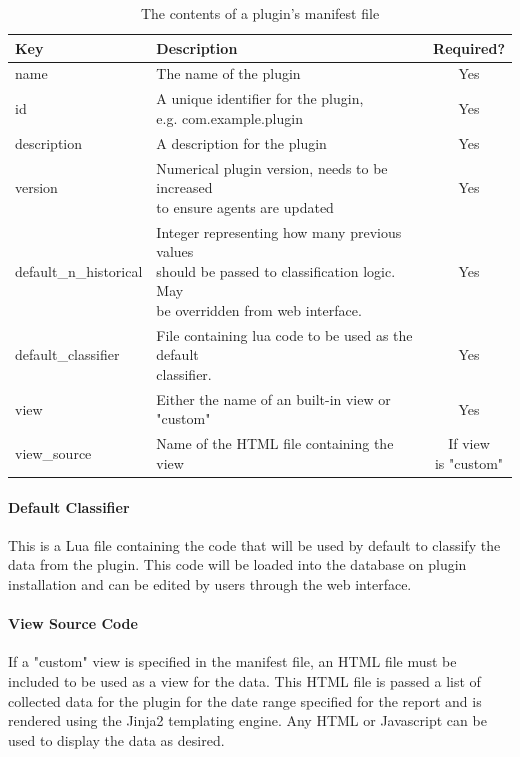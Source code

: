 \documentclass[bsc,logo,twoside,singlespacing,notimes]{infthesis}
\begin{document}
\begin{table}[H]
	\centering
	\caption{The contents of a plugin's manifest file}
	\label{table-manifest-contents}
    \begin{tabular}{|l|l|c|}
    \hline
    \textbf{Key} & \textbf{Description} & \textbf{Required?} \\ \hline \hline
    name
    	& The name of the plugin
    	& Yes \\ \hline
    id
    	& \shortstack[l]{A unique identifier for the plugin,\\
    		e.g. com.example.plugin}
    	& Yes \\ \hline
    description
    	& A description for the plugin
    	& Yes \\ \hline
    version
    	& \shortstack[l]{Numerical plugin version, needs to be increased\\to ensure
    		agents are updated}
    	& Yes \\ \hline
    default\_n\_historical
    	& \shortstack[l]{Integer representing how many previous values \\
    		should be passed to classification logic. May\\be overridden from web interface.}
    	& Yes \\ \hline
    default\_classifier
    	& \shortstack[l]{File containing lua code to be used as the default\\
    		classifier.}
    	& Yes \\ \hline
    view
    	& Either the name of an built-in view or "custom"
    	& Yes \\ \hline
    view\_source
    	& Name of the HTML file containing the view
    	& \shortstack[c]{If view\\is "custom"} \\ \hline
    \end{tabular}
\end{table}

\paragraph*{Default Classifier}
	This is a Lua file containing the code that will be used by default to classify
	the data from the plugin.  This code will be loaded into the database on plugin
	installation and can be edited by users through the web interface.
	
\paragraph*{View Source Code}
	If a "custom" view is specified in the manifest file, an HTML file must be
	included to be used as a view for the data.  This HTML file is passed a list of
	collected data for the plugin for the date range specified for the report
	and is rendered using the Jinja2 templating engine.  Any HTML or Javascript
	can be used to display the data as desired.
	
\end{document}

